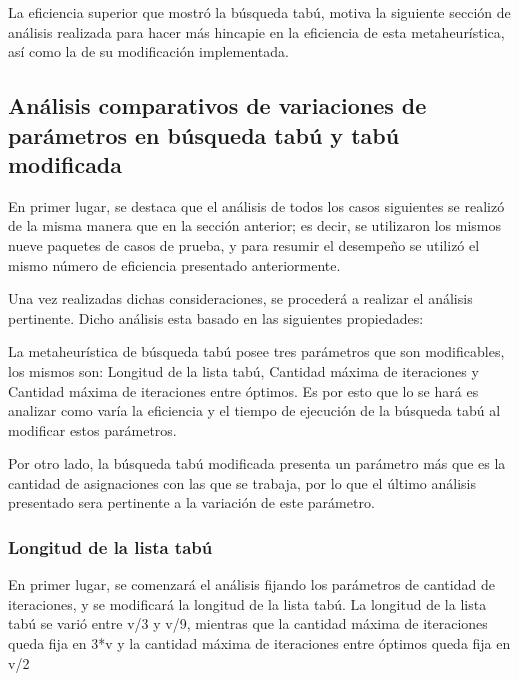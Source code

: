 \documentclass[a4paper,10pt]{article}
\begin{document}
\bigskip

La eficiencia superior que mostr\'o la b\'usqueda tab\'u, motiva la siguiente secci\'on de an\'alisis realizada para hacer m\'as hincapie en la eficiencia de esta metaheur\'istica, as\'i como la de su modificaci\'on implementada.

\subsection*{An\'alisis comparativos de variaciones de par\'ametros en b\'usqueda tab\'u y tab\'u modificada}

En primer lugar, se destaca que el an\'alisis de todos los casos siguientes se realiz\'o de la misma manera que en la secci\'on anterior; es decir, se utilizaron los mismos nueve paquetes de casos de prueba, y para resumir el desempe\~{n}o se utiliz\'o el mismo n\'umero de eficiencia presentado anteriormente.

Una vez realizadas dichas consideraciones, se proceder\'a a realizar el an\'alisis pertinente. Dicho an\'alisis esta basado en las siguientes propiedades: 

La metaheur\'istica de b\'usqueda tab\'u posee tres par\'ametros que son modificables, los mismos son: Longitud de la lista tab\'u, Cantidad m\'axima de iteraciones y Cantidad m\'axima de iteraciones entre \'optimos. Es por esto que lo se har\'a es analizar como var\'ia la eficiencia y el tiempo de ejecuci\'on de la b\'usqueda tab\'u al modificar estos par\'ametros.

Por otro lado, la b\'usqueda tab\'u modificada presenta un par\'ametro m\'as que es la cantidad de asignaciones con las que se trabaja, por lo que el \'ultimo an\'alisis presentado sera pertinente a la variaci\'on de este par\'ametro.

\bigskip

\subsubsection*{Longitud de la lista tab\'u}

En primer lugar, se comenzar\'a el an\'alisis fijando los par\'ametros de cantidad de iteraciones, y se modificar\'a la longitud de la lista tab\'u. La longitud de la lista tab\'u se vari\'o entre v/3 y v/9, mientras que la cantidad m\'axima de iteraciones queda fija en 3*v y la cantidad m\'axima de iteraciones entre \'optimos queda fija en v/2
\end{document}
